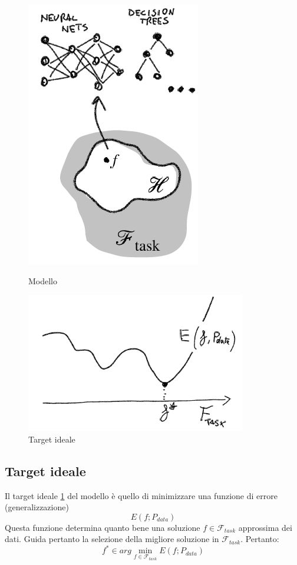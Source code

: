 \begin{figure}
	\centering
	\begin{minipage}{.5\textwidth}
		\centering
		\includegraphics[width=0.4\linewidth]{imgs/chapter2/img1}
		\caption{Modello}
		\label{fig:chapter02-01}
	\end{minipage}%
	\begin{minipage}{.5\textwidth}
		\centering
		\includegraphics[width=1\linewidth]{imgs/chapter2/img2}
		\caption{Target ideale}
		\label{fig:chapter02-02}
	\end{minipage}
\end{figure}

	\subsection{Target ideale}
	Il target ideale \ref{fig:chapter02-02} del modello \`e quello di minimizzare una funzione di errore (generalizzazione)
	$$E(f;P_{data})$$
	Questa funzione determina quanto bene una soluzione $f\in\mathcal{F}_{task}$ approssima dei dati.
	Guida pertanto la selezione della migliore soluzione in $\mathcal{F}_{task}$.
	Pertanto:
	$$f^*\in arg\min\limits_{f\in\mathcal{F}_{task}}E(f;P_{data})$$
	
